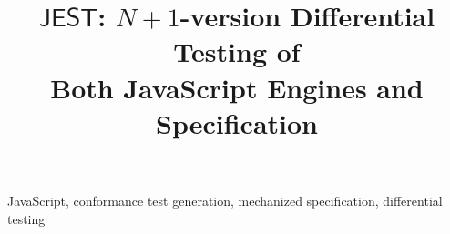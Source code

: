 \documentclass[10pt,conference]{IEEEtran}
\begin{document}
\title{$\textsf{JEST}$: $N\!+\!1$-version Differential Testing of\\ Both JavaScript Engines and Specification}





\author{
}

% 
% 
% 
% 
% 
% 

\maketitle



\begin{IEEEkeywords}
JavaScript, conformance test generation, mechanized specification,
differential testing
\end{IEEEkeywords}










\end{document}
